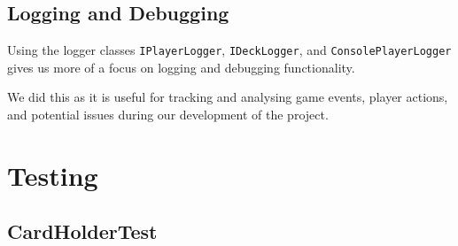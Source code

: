 \documentclass{article}
\begin{document}
\subsection{Logging and Debugging}
Using the logger classes \texttt{IPlayerLogger}, \texttt{IDeckLogger}, and \texttt{ConsolePlayerLogger} gives us more of a focus on logging and debugging functionality.

We did this as it is useful for tracking and analysing game events, player actions, and potential issues during our development of the project.


\section{Testing}

\subsection{CardHolderTest}
\end{document}
